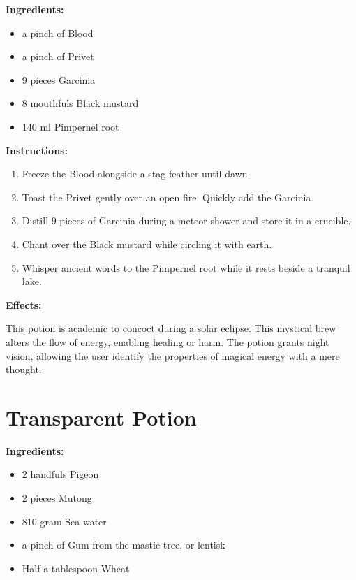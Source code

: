 \documentclass{article}
\begin{document}
\textbf{Ingredients:}

\begin{itemize}
  \item a pinch of Blood
  \item a pinch of Privet
  \item 9 pieces Garcinia
  \item 8 mouthfuls Black mustard
  \item 140 ml Pimpernel root
\end{itemize}

\textbf{Instructions:}

\begin{enumerate}
  \item Freeze the Blood alongside a stag feather until dawn.
  \item Toast the Privet gently over an open fire. Quickly add the Garcinia.
  \item Distill 9 pieces of Garcinia during a meteor shower and store it in a crucible.
  \item Chant over the Black mustard while circling it with earth.
  \item Whisper ancient words to the Pimpernel root while it rests beside a tranquil lake.
\end{enumerate}

\textbf{Effects:}

This potion is academic to concoct during a solar eclipse. This mystical brew alters the flow of energy, enabling healing or harm. The potion grants night vision, allowing the user identify the properties of magical energy with a mere thought.

\newpage
\section*{Transparent Potion}

\textbf{Ingredients:}

\begin{itemize}
  \item 2 handfuls Pigeon
  \item 2 pieces Mutong
  \item 810 gram Sea-water
  \item a pinch of Gum from the mastic tree, or lentisk
  \item Half a tablespoon Wheat
\end{itemize}
\end{document}
